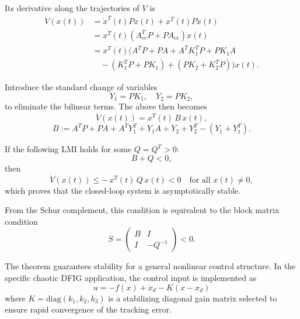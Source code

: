 \documentclass[conference]{IEEEtran}
\begin{document}
Its derivative along the trajectories of $V$ is
\begin{equation*}
\begin{split}
\dot{V}\left( x(t) \right) &= \dot{x}^{T}(t)Px(t) + x^{T}(t)P\dot{x}(t) \\
&= x^{T}(t)\left( A_{ce}^{T}P + PA_{ce} \right)x(t) \\
&= x^{T}(t)\Big( A^{T}P + PA + A^{T}K_{1}^{T}P + PK_{1}A \\
&\quad- \left( K_{1}^{T}P + PK_{1} \right) + \left( PK_{2} + K_{2}^{T}P \right) \Big)x(t).
\end{split}
\end{equation*}

Introduce the standard change of variables
\begin{equation*}
Y_{1} = PK_{1},\quad Y_{2} = PK_{2},
\end{equation*}
to eliminate the bilinear terms. The above then becomes
\begin{equation*}
\dot{V}\left( x(t) \right) = x^{T}(t)\, B\, x(t),
\end{equation*}
\begin{equation*}
B := A^{T}P + PA + A^{T}Y_{1}^{T} + Y_{1}A + Y_{2} + Y_{2}^{T} - \left( Y_{1} + Y_{1}^{T} \right).
\end{equation*}

If the following LMI holds for some $Q = Q^{T} > 0$:
\begin{equation*}
B + Q < 0,
\end{equation*}
then
\begin{equation*}
\dot{V}\left( x(t) \right) \leq - \, x^{T}(t)\, Q\, x(t) < 0\quad\text{for all }x(t) \neq 0,
\end{equation*}
which proves that the closed-loop system is asymptotically stable.

From the Schur complement, this condition is equivalent to the block matrix condition
\begin{equation*}
S = \begin{pmatrix}
B & I \\
I & - Q^{-1}
\end{pmatrix} < 0.
\end{equation*}

The theorem guarantees stability for a general nonlinear control structure. In the specific chaotic DFIG application, the control input is implemented as
\begin{equation}
u = - f(x) + \dot{x}_{d} - K\left( x - x_{d} \right)
\label{eq22}
\end{equation}
where $K = \text{diag}\left( k_{1},k_{2},k_{3} \right)$ is a stabilizing diagonal gain matrix selected to ensure rapid convergence of the tracking error.
\end{document}
